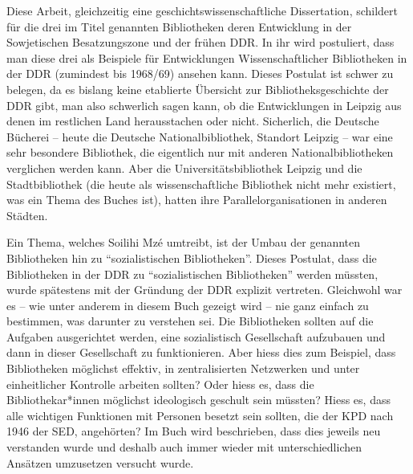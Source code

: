 \documentclass[a4paper,
fontsize=11pt,
oneside,
numbers=noperiodatend,
parskip=half-,
bibliography=totoc,
final
]{scrartcl}
\begin{document}
Diese Arbeit, gleichzeitig eine geschichtswissenschaftliche
Dissertation, schildert für die drei im Titel genannten Bibliotheken
deren Entwicklung in der Sowjetischen Besatzungszone und der frühen DDR.
In ihr wird postuliert, dass man diese drei als Beispiele für
Entwicklungen Wissenschaftlicher Bibliotheken in der DDR (zumindest bis
1968/69) ansehen kann. Dieses Postulat ist schwer zu belegen, da es
bislang keine etablierte Übersicht zur Bibliotheksgeschichte der DDR
gibt, man also schwerlich sagen kann, ob die Entwicklungen in Leipzig
aus denen im restlichen Land herausstachen oder nicht. Sicherlich, die
Deutsche Bücherei -- heute die Deutsche Nationalbibliothek, Standort
Leipzig -- war eine sehr besondere Bibliothek, die eigentlich nur mit
anderen Nationalbibliotheken verglichen werden kann. Aber die
Universitätsbibliothek Leipzig und die Stadtbibliothek (die heute als
wissenschaftliche Bibliothek nicht mehr existiert, was ein Thema des
Buches ist), hatten ihre Parallelorganisationen in anderen Städten.

Ein Thema, welches Soilihi Mzé umtreibt, ist der Umbau der genannten
Bibliotheken hin zu ``sozialistischen Bibliotheken''. Dieses Postulat,
dass die Bibliotheken in der DDR zu ``sozialistischen Bibliotheken''
werden müssten, wurde spätestens mit der Gründung der DDR explizit
vertreten. Gleichwohl war es -- wie unter anderem in diesem Buch gezeigt
wird -- nie ganz einfach zu bestimmen, was darunter zu verstehen sei.
Die Bibliotheken sollten auf die Aufgaben ausgerichtet werden, eine
sozialistisch Gesellschaft aufzubauen und dann in dieser Gesellschaft zu
funktionieren. Aber hiess dies zum Beispiel, dass Bibliotheken möglichst
effektiv, in zentralisierten Netzwerken und unter einheitlicher
Kontrolle arbeiten sollten? Oder hiess es, dass die Bibliothekar*innen
möglichst ideologisch geschult sein müssten? Hiess es, dass alle
wichtigen Funktionen mit Personen besetzt sein sollten, die der KPD nach
1946 der SED, angehörten? Im Buch wird beschrieben, dass dies jeweils
neu verstanden wurde und deshalb auch immer wieder mit unterschiedlichen
Ansätzen umzusetzen versucht wurde.
\end{document}
